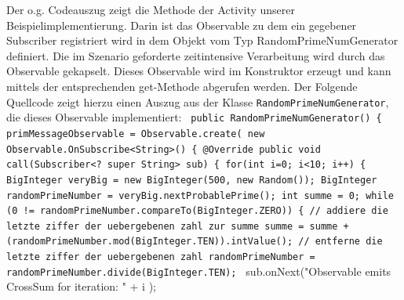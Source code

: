 \documentclass[12pt,oneside,a4paper,bibtotoc,liststotoc]{scrreprt}
\begin{document}
   Der o.g. Codeauszug zeigt die Methode der Activity unserer Beispielimplementierung. Darin ist das Observable zu dem ein gegebener Subscriber registriert wird in dem Objekt vom Typ RandomPrimeNumGenerator definiert. Die im Szenario geforderte zeitintensive Verarbeitung wird durch das Observable gekapselt. Dieses Observable wird im Konstruktor erzeugt und kann mittels der entsprechenden get-Methode abgerufen werden. Der Folgende Quellcode zeigt hierzu einen Auszug aus der Klasse \texttt{RandomPrimeNumGenerator}, die dieses Observable implementiert:\newline
   \texttt{\newline
 public RandomPrimeNumGenerator()\newline
   \{\newline
   primMessageObservable = Observable.create(\newline
           new Observable.OnSubscribe<String>() \{\newline
               @Override\newline
               public void call(Subscriber<? super String> sub) \{\newline
               \newline
                   for(int i=0; i<10; i++)\newline
                   \{\newline
                       BigInteger veryBig = new BigInteger(500, new Random());\newline
                       BigInteger randomPrimeNumber = veryBig.nextProbablePrime();\newline
                       int summe = 0;\newline
                       while (0 != randomPrimeNumber.compareTo(BigInteger.ZERO)) \{\newline
                           // addiere die letzte ziffer der uebergebenen zahl zur summe\newline
                           summe = summe + (randomPrimeNumber.mod(BigInteger.TEN)).intValue();\newline
                           // entferne die letzte ziffer der uebergebenen zahl\newline
                           randomPrimeNumber = randomPrimeNumber.divide(BigInteger.TEN);\newline
                       }\newline
\newline
                      sub.onNext("Observable emits CrossSum for iteration: " + i );\newline
\end{document}
